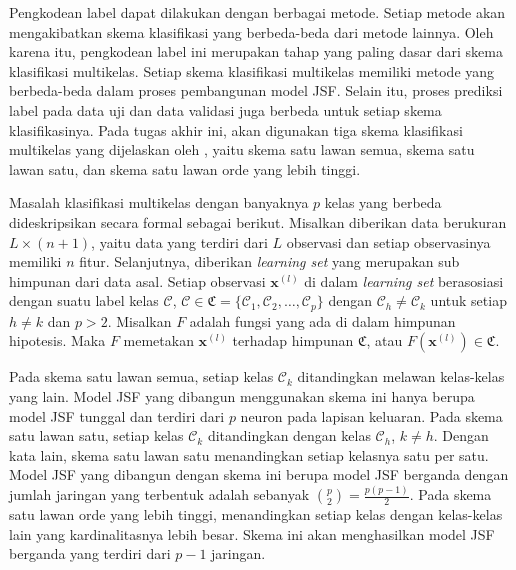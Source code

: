 \noindent Pengkodean label dapat dilakukan dengan berbagai metode. Setiap metode akan mengakibatkan skema klasifikasi yang berbeda-beda dari metode lainnya. Oleh karena itu, pengkodean label ini merupakan tahap yang paling dasar dari skema klasifikasi multikelas. Setiap skema klasifikasi multikelas memiliki metode yang berbeda-beda dalam proses pembangunan model JSF. Selain itu, proses prediksi label pada data uji dan data validasi juga berbeda untuk setiap skema klasifikasinya. Pada tugas akhir ini, akan digunakan tiga skema klasifikasi multikelas yang dijelaskan oleh , yaitu skema satu lawan semua, skema satu lawan satu, dan skema satu lawan orde yang lebih tinggi.

\noindent Masalah klasifikasi multikelas dengan banyaknya $p$ kelas yang berbeda dideskripsikan secara formal sebagai berikut. Misalkan diberikan data berukuran $L\times(n+1)$, yaitu data yang terdiri dari $L$ observasi dan setiap observasinya memiliki $n$ fitur. Selanjutnya, diberikan \emph{learning set} yang merupakan sub himpunan dari data asal. Setiap observasi $\mathbf{x}^{(l)}$ di dalam \emph{learning set} berasosiasi dengan suatu label kelas $\mathcal{C}$, $\mathcal{C} \in \mathfrak{C} = \{\mathcal{C}_1, \mathcal{C}_2, \ldots, \mathcal{C}_p\}$ dengan $\mathcal{C}_h \neq \mathcal{C}_k$ untuk setiap $h\neq k$ dan $p>2$. Misalkan $F$ adalah fungsi yang ada di dalam himpunan hipotesis. Maka $F$ memetakan $\mathbf{x}^{(l)}$ terhadap himpunan $\mathfrak{C}$, atau $F (\mathbf{x}^{(l)}) \in \mathfrak{C}$.

\noindent Pada skema satu lawan semua, setiap kelas $\mathcal{C}_k$ ditandingkan melawan kelas-kelas yang lain. Model JSF yang dibangun menggunakan skema ini hanya berupa model JSF tunggal dan terdiri dari $p$ neuron pada lapisan keluaran. Pada skema satu lawan satu, setiap kelas $\mathcal{C}_k$ ditandingkan dengan kelas $\mathcal{C}_h$, $k\neq h$. Dengan kata lain, skema satu lawan satu menandingkan setiap kelasnya satu per satu. Model JSF yang dibangun dengan skema ini berupa model JSF berganda dengan jumlah jaringan yang terbentuk adalah sebanyak $\binom{p}{2} = \frac{p(p-1)} {2}$. Pada skema satu lawan orde yang lebih tinggi, menandingkan setiap kelas dengan kelas-kelas lain yang kardinalitasnya lebih besar. Skema ini akan menghasilkan model JSF berganda yang terdiri dari $p-1$ jaringan.

